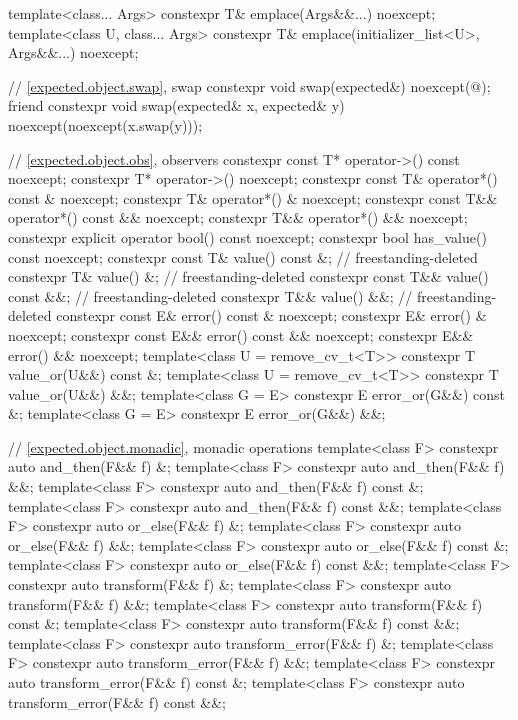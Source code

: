\begin{codeblock}
{{    template<class... Args>
      constexpr T& emplace(Args&&...) noexcept;
    template<class U, class... Args>
      constexpr T& emplace(initializer_list<U>, Args&&...) noexcept;

    // \ref{expected.object.swap}, swap
    constexpr void swap(expected&) noexcept(@\seebelow@);
    friend constexpr void swap(expected& x, expected& y) noexcept(noexcept(x.swap(y)));

    // \ref{expected.object.obs}, observers
    constexpr const T* operator->() const noexcept;
    constexpr T* operator->() noexcept;
    constexpr const T& operator*() const & noexcept;
    constexpr T& operator*() & noexcept;
    constexpr const T&& operator*() const && noexcept;
    constexpr T&& operator*() && noexcept;
    constexpr explicit operator bool() const noexcept;
    constexpr bool has_value() const noexcept;
    constexpr const T& value() const &;                                     // freestanding-deleted
    constexpr T& value() &;                                                 // freestanding-deleted
    constexpr const T&& value() const &&;                                   // freestanding-deleted
    constexpr T&& value() &&;                                               // freestanding-deleted
    constexpr const E& error() const & noexcept;
    constexpr E& error() & noexcept;
    constexpr const E&& error() const && noexcept;
    constexpr E&& error() && noexcept;
    template<class U = remove_cv_t<T>> constexpr T value_or(U&&) const &;
    template<class U = remove_cv_t<T>> constexpr T value_or(U&&) &&;
    template<class G = E> constexpr E error_or(G&&) const &;
    template<class G = E> constexpr E error_or(G&&) &&;

    // \ref{expected.object.monadic}, monadic operations
    template<class F> constexpr auto and_then(F&& f) &;
    template<class F> constexpr auto and_then(F&& f) &&;
    template<class F> constexpr auto and_then(F&& f) const &;
    template<class F> constexpr auto and_then(F&& f) const &&;
    template<class F> constexpr auto or_else(F&& f) &;
    template<class F> constexpr auto or_else(F&& f) &&;
    template<class F> constexpr auto or_else(F&& f) const &;
    template<class F> constexpr auto or_else(F&& f) const &&;
    template<class F> constexpr auto transform(F&& f) &;
    template<class F> constexpr auto transform(F&& f) &&;
    template<class F> constexpr auto transform(F&& f) const &;
    template<class F> constexpr auto transform(F&& f) const &&;
    template<class F> constexpr auto transform_error(F&& f) &;
    template<class F> constexpr auto transform_error(F&& f) &&;
    template<class F> constexpr auto transform_error(F&& f) const &;
    template<class F> constexpr auto transform_error(F&& f) const &&;

}}
\end{codeblock}
